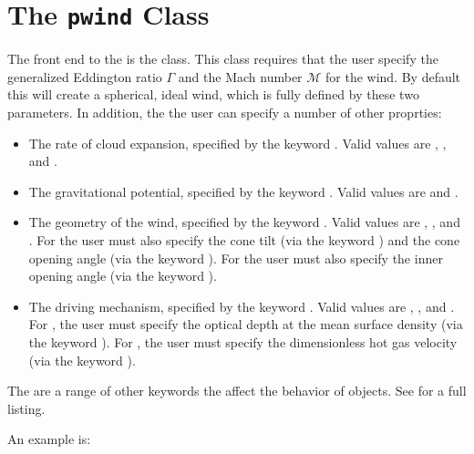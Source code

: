 \documentclass[letterpaper,10pt,english]{sphinxmanual}
\begin{document}
\section{The \texttt{pwind} Class}
\label{winds:the-pwind-class}\label{winds:ssec-wind-pwind}
The front end to the  is the  class. This
class requires that the user specify the generalized Eddington ratio
\(\Gamma\) and the Mach number \(\mathcal{M}\) for the
wind. By default this will create a spherical, ideal wind, which is
fully defined by these two parameters. In addition, the the user can
specify a number of other proprties:
\begin{itemize}
\item {} 
The rate of cloud expansion, specified by the keyword
. Valid values are , , and
.

\item {} 
The gravitational potential, specified by the keyword
. Valid values are  and .

\item {} 
The geometry of the wind, specified by the keyword
. Valid values are , , and
. For  the user must also specify the cone
tilt (via the keyword ) and the cone opening angle (via the
keyword ). For  the user must also specify
the inner opening angle (via the keyword ).

\item {} 
The driving mechanism, specified by the keyword . Valid
values are , , and . For ,
the user must specify the optical depth at the mean surface density
(via the keyword ). For , the user must specify the
dimensionless hot gas velocity (via the keyword ).

\end{itemize}

The are a range of other keywords the affect the behavior of 
objects. See {\hyperref[fulldoc:sssec\string-full\string-pwind]{}} for a full listing.

An example is:
\end{document}
